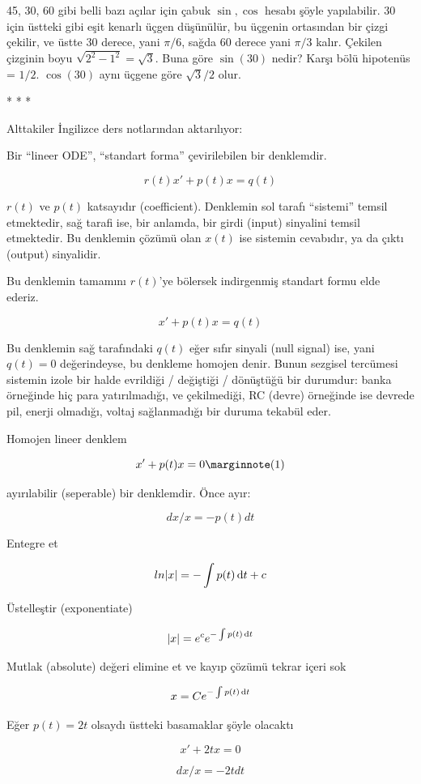\documentclass[12pt,fleqn]{article}\usepackage{../../common}
\begin{document}
45, 30, 60 gibi belli bazı açılar için çabuk $\sin,\cos$ hesabı şöyle
yapılabilir. 30 için üstteki gibi eşit kenarlı üçgen düşünülür, bu üçgenin
ortasından bir çizgi çekilir, ve üstte 30 derece, yani $\pi/6$, sağda 60
derece yani $\pi/3$ kalır. Çekilen çizginin boyu
$\sqrt{2^2 - 1^2} = \sqrt{3}$. Buna göre $\sin(30)$ nedir? Karşı bölü
hipotenüs = $1/2$. $\cos(30)$ aynı üçgene göre $\sqrt{3}/2$ olur.

* * *

Alttakiler İngilizce ders notlarından aktarılıyor:

Bir ``lineer ODE'', ``standart forma'' çevirilebilen bir denklemdir.

$$ r(t)x' + p(t)x = q(t) $$

$r(t)$ ve $p(t)$ katsayıdır (coefficient). Denklemin sol tarafı ``sistemi''
temsil etmektedir, sağ tarafi ise, bir anlamda, bir girdi (input) sinyalini
temsil etmektedir. Bu denklemin çözümü olan $x(t)$ ise sistemin cevabıdır,
ya da çıktı (output) sinyalidir.

Bu denklemin tamamını $r(t)$'ye bölersek indirgenmiş standart formu elde
ederiz.

$$ x' + p(t)x = q(t) $$

Bu denklemin sağ tarafındaki $q(t)$ eğer sıfır sinyali (null signal) ise,
yani $q(t) = 0$ değerindeyse, bu denkleme homojen denir. Bunun sezgisel
tercümesi sistemin izole bir halde evrildiği / değiştiği / dönüştüğü bir
durumdur: banka örneğinde hiç para yatırılmadığı, ve çekilmediği, RC
(devre) örneğinde ise devrede pil, enerji olmadığı, voltaj sağlanmadığı bir
duruma tekabül eder.

Homojen lineer denklem

$$
x' + p(t) x = 0 
\mlabel{1}
$$

ayırılabilir (seperable) bir denklemdir. Önce ayır:

$$ dx/x = - p(t) dt $$

Entegre et

$$ ln|x| = - \int p(t) \,\mathrm{d} t + c $$

Üstelleştir (exponentiate)

$$ |x| = e^c e^{ - \int p(t) \,\mathrm{d} t } $$

Mutlak (absolute) değeri elimine et ve kayıp çözümü tekrar içeri sok

$$ x = C e^{- \int p(t) \,\mathrm{d} t} $$

Eğer $p(t) = 2t$ olsaydı üstteki basamaklar şöyle olacaktı

$$ x' + 2tx = 0 $$

$$ dx/x = - 2t dt $$
\end{document}
